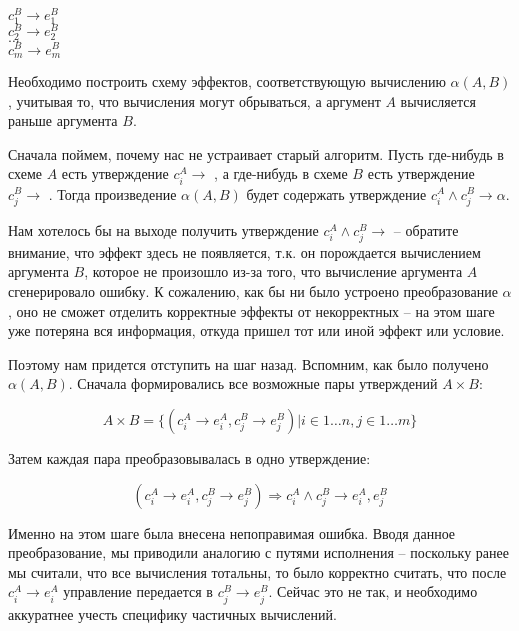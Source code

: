 \bigskip

{
	$c^B_1 \rightarrow e^B_1$ \\
	$c^B_2 \rightarrow e^B_2$ \\
	$\ldots$ \\
	$c^B_m \rightarrow e^B_m$ \\        
}{}

Необходимо построить схему эффектов, соответствующую вычислению $\alpha(A, B)$, учитывая то, что вычисления могут обрываться, а аргумент $A$ вычисляется раньше аргумента $B$.

Сначала поймем, почему нас не устраивает старый алгоритм. Пусть где-нибудь в схеме $A$ есть утверждение $c^A_i \rightarrow $ , а где-нибудь в схеме $B$ есть утверждение $c^B_j \rightarrow$ . Тогда произведение $\alpha(A, B)$ будет содержать утверждение $c^A_i \land c^B_j \rightarrow \alpha$. 

Нам хотелось бы на выходе получить утверждение $c^A_i \land c^B_j \rightarrow$  -- обратите внимание, что эффект  здесь не появляется, т.к. он порождается вычислением аргумента $B$, которое не произошло из-за того, что вычисление аргумента $A$ сгенерировало ошибку. К сожалению, как бы ни было устроено преобразование $\alpha$, оно не сможет отделить корректные эффекты от некорректных -- на этом шаге уже потеряна вся информация, откуда пришел тот или иной эффект или условие.

Поэтому нам придется отступить на шаг назад. Вспомним, как было получено $\alpha(A, B)$. Сначала формировались все возможные пары утверждений $A \times B$:

$$A \times B = \big\{ (c^A_i \rightarrow e^A_i, c^B_j \rightarrow e^B_j) \rvert i \in 1 \ldots n, j \in 1 \ldots m \big\}$$

Затем каждая пара преобразовывалась в одно утверждение:

$$ (c^A_i \rightarrow e^A_i, c^B_j \rightarrow e^B_j) \Rightarrow c^A_i \land c^B_j \rightarrow e^A_i, e^B_j $$

Именно на этом шаге была внесена непоправимая ошибка. Вводя данное преобразование, мы приводили аналогию с путями исполнения -- поскольку ранее мы считали, что все вычисления тотальны, то было корректно считать, что после $c^A_i \rightarrow e^A_i$ управление передается в $c^B_j \rightarrow e^B_j$. Сейчас это не так, и необходимо аккуратнее учесть специфику частичных вычислений.

